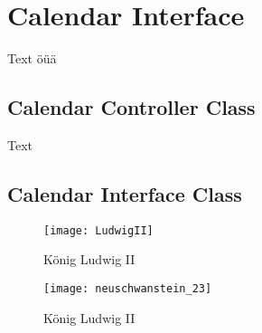 \chapter{Calendar Interface}
Text
öüä


\section{Calendar Controller Class}
Text

\section{Calendar Interface Class}

\begin{figure}[htb]
    \centering
    \texttt{[image: LudwigII]}
    \caption{König Ludwig II}
\end{figure}


\begin{figure}[htb]
    \centering
    \texttt{[image: neuschwanstein\_23]}
    \caption{König Ludwig II}
\end{figure}

